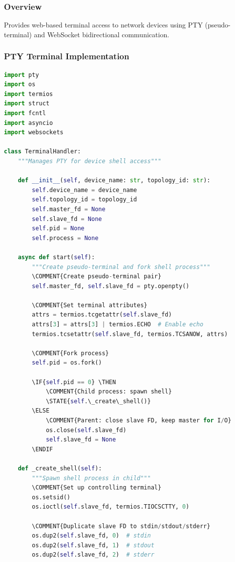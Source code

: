 \documentclass[10pt,a4paper]{article}
\begin{document}
\subsubsection{Overview}
Provides web-based terminal access to network devices using PTY (pseudo-terminal) and WebSocket bidirectional communication.

\subsubsection{PTY Terminal Implementation}

\begin{lstlisting}[language=python, caption=PTY Terminal Management]
import pty
import os
import termios
import struct
import fcntl
import asyncio
import websockets

class TerminalHandler:
    """Manages PTY for device shell access"""

    def __init__(self, device_name: str, topology_id: str):
        self.device_name = device_name
        self.topology_id = topology_id
        self.master_fd = None
        self.slave_fd = None
        self.pid = None
        self.process = None

    async def start(self):
        """Create pseudo-terminal and fork shell process"""
        \COMMENT{Create pseudo-terminal pair}
        self.master_fd, self.slave_fd = pty.openpty()

        \COMMENT{Set terminal attributes}
        attrs = termios.tcgetattr(self.slave_fd)
        attrs[3] = attrs[3] | termios.ECHO  # Enable echo
        termios.tcsetattr(self.slave_fd, termios.TCSANOW, attrs)

        \COMMENT{Fork process}
        self.pid = os.fork()

        \IF{self.pid == 0} \THEN
            \COMMENT{Child process: spawn shell}
            \STATE{self.\_create\_shell()}
        \ELSE
            \COMMENT{Parent: close slave FD, keep master for I/O}
            os.close(self.slave_fd)
            self.slave_fd = None
        \ENDIF

    def _create_shell(self):
        """Spawn shell process in child"""
        \COMMENT{Set up controlling terminal}
        os.setsid()
        os.ioctl(self.slave_fd, termios.TIOCSCTTY, 0)

        \COMMENT{Duplicate slave FD to stdin/stdout/stderr}
        os.dup2(self.slave_fd, 0)  # stdin
        os.dup2(self.slave_fd, 1)  # stdout
        os.dup2(self.slave_fd, 2)  # stderr


\end{lstlisting}
\end{document}
